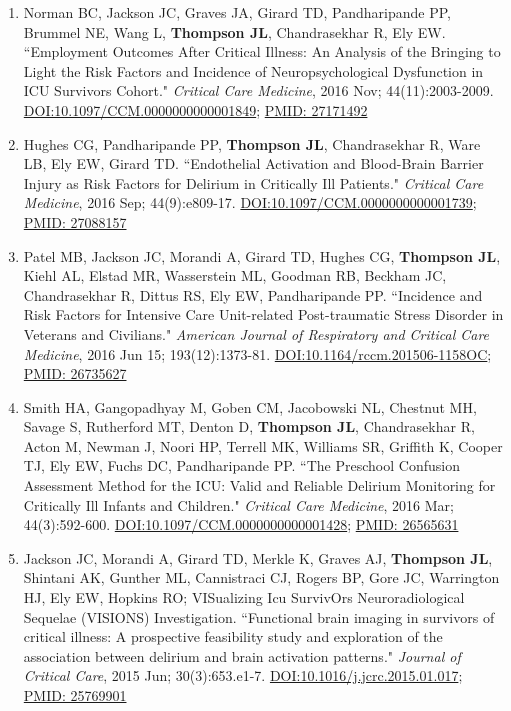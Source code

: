 \documentclass[5pt]{article}
\begin{document}
\begin{enumerate}
\item Norman BC, Jackson JC, Graves JA, Girard TD, Pandharipande PP, Brummel NE, Wang L, \textbf{Thompson JL}, Chandrasekhar R, Ely EW. ``Employment Outcomes After Critical Illness: An Analysis of the Bringing to Light the Risk Factors and Incidence of Neuropsychological Dysfunction in ICU Survivors Cohort." \emph{Critical Care Medicine}, 2016 Nov; 44(11):2003-2009. \href{https://doi.org/10.1097/CCM.0000000000001849}{DOI:10.1097/CCM.0000000000001849}; \href{https://www.ncbi.nlm.nih.gov/pubmed/27171492}{PMID: 27171492}
\item Hughes CG, Pandharipande PP, \textbf{Thompson JL}, Chandrasekhar R, Ware LB, Ely EW, Girard TD. ``Endothelial Activation and Blood-Brain Barrier Injury as Risk Factors for Delirium in Critically Ill Patients." \emph{Critical Care Medicine}, 2016 Sep; 44(9):e809-17. \href{https://doi.org/10.1097/CCM.0000000000001739}{DOI:10.1097/CCM.0000000000001739}; \href{https://www.ncbi.nlm.nih.gov/pubmed/27088157}{PMID: 27088157}
\item Patel MB, Jackson JC, Morandi A, Girard TD, Hughes CG, \textbf{Thompson JL}, Kiehl AL, Elstad MR, Wasserstein ML, Goodman RB, Beckham JC, Chandrasekhar R, Dittus RS, Ely EW, Pandharipande PP. ``Incidence and Risk Factors for Intensive Care Unit-related Post-traumatic Stress Disorder in Veterans and Civilians." \emph{American Journal of Respiratory and Critical Care Medicine}, 2016 Jun 15; 193(12):1373-81. \href{https://doi.org/10.1164/rccm.201506-1158OC}{DOI:10.1164/rccm.201506-1158OC}; \href{https://www.ncbi.nlm.nih.gov/pubmed/26735627}{PMID: 26735627}
\item Smith HA, Gangopadhyay M, Goben CM, Jacobowski NL, Chestnut MH, Savage S, Rutherford MT, Denton D, \textbf{Thompson JL}, Chandrasekhar R, Acton M, Newman J, Noori HP, Terrell MK, Williams SR, Griffith K, Cooper TJ, Ely EW, Fuchs DC, Pandharipande PP. ``The Preschool Confusion Assessment Method for the ICU: Valid and Reliable Delirium Monitoring for Critically Ill Infants and Children." \emph{Critical Care Medicine}, 2016 Mar; 44(3):592-600. \href{https://doi.org/10.1097/CCM.0000000000001428}{DOI:10.1097/CCM.0000000000001428}; \href{https://www.ncbi.nlm.nih.gov/pubmed/26565631}{PMID: 26565631}
\item Jackson JC, Morandi A, Girard TD, Merkle K, Graves AJ, \textbf{Thompson JL}, Shintani AK, Gunther ML, Cannistraci CJ, Rogers BP, Gore JC, Warrington HJ, Ely EW, Hopkins RO; VISualizing Icu SurvivOrs Neuroradiological Sequelae (VISIONS) Investigation. ``Functional brain imaging in survivors of critical illness: A prospective feasibility study and exploration of the association between delirium and brain activation patterns." \emph{Journal of Critical Care}, 2015 Jun; 30(3):653.e1-7. \href{https://doi.org/10.1016/j.jcrc.2015.01.017}{DOI:10.1016/j.jcrc.2015.01.017}; \href{https://www.ncbi.nlm.nih.gov/pubmed/25769901}{PMID: 25769901}

\end{enumerate}
\end{document}
